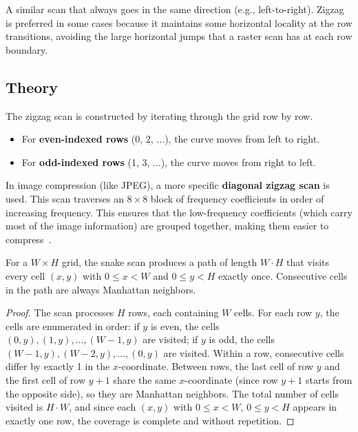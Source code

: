 \begin{definition}\label{def:raster_scan}
A similar scan that always goes in the same direction (e.g., left-to-right). Zigzag is preferred in some cases because it maintains some horizontal locality at the row transitions, avoiding the large horizontal jumps that a raster scan has at each row boundary.
\end{definition}

\subsection{Theory}
The zigzag scan is constructed by iterating through the grid row by row.
\begin{itemize}
    \item For \textbf{even-indexed rows} (0, 2, $\ldots$), the curve moves from left to right.
    \item For \textbf{odd-indexed rows} (1, 3, $\ldots$), the curve moves from right to left.
\end{itemize}

In image compression (like JPEG), a more specific \textbf{diagonal zigzag scan} is used. This scan traverses an $8 \times 8$ block of frequency coefficients in order of increasing frequency. This ensures that the low-frequency coefficients (which carry most of the image information) are grouped together, making them easier to compress~\cite{pennebaker1992}.

\begin{theorem}\label{thm:zigzag_complete}
For a $W \times H$ grid, the snake scan produces a path of length $W \cdot H$ that visits every cell $(x, y)$ with $0 \le x < W$ and $0 \le y < H$ exactly once. Consecutive cells in the path are always Manhattan neighbors.
\end{theorem}

\begin{proof}
The scan processes $H$ rows, each containing $W$ cells. For each row $y$, the cells are enumerated in order: if $y$ is even, the cells $(0,y), (1,y), \ldots, (W-1,y)$ are visited; if $y$ is odd, the cells $(W-1,y), (W-2,y), \ldots, (0,y)$ are visited. Within a row, consecutive cells differ by exactly 1 in the $x$-coordinate. Between rows, the last cell of row $y$ and the first cell of row $y+1$ share the same $x$-coordinate (since row $y+1$ starts from the opposite side), so they are Manhattan neighbors. The total number of cells visited is $H \cdot W$, and since each $(x, y)$ with $0 \le x < W$, $0 \le y < H$ appears in exactly one row, the coverage is complete and without repetition.
\end{proof}

